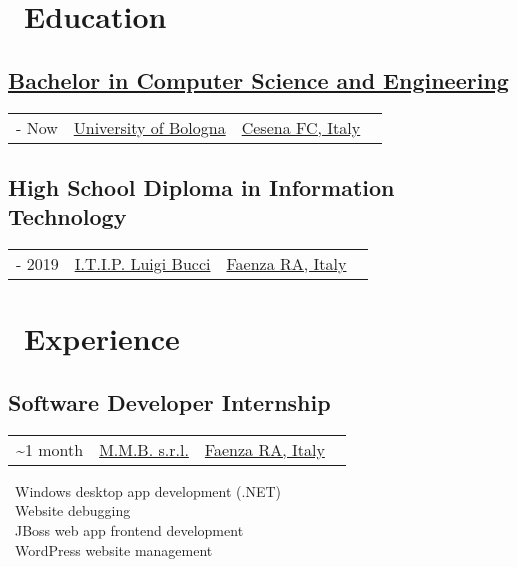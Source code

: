\documentclass{article}
\makeatletter
\newcommand{\event}[3]{
    \begin{tabularx}{\linewidth}{@{}>{\raggedright\arraybackslash}X >{\centering\arraybackslash}X >{\raggedleft\arraybackslash}X@{}}
        #1 & #2 & #3
    \end{tabularx}
    \vspace{-10pt}
}
\makeatother
\begin{document}
\setlength{\columnsep}{50pt}
\begin{paracol}{2}
    \section*{\faGraduationCap \ Education}

    \begin{tcolorbox}
        \subsection*{\href{https://corsi.unibo.it/1cycle/ComputerScienceEngineering}{Bachelor in Computer Science and Engineering}}
        \event
            {\faCalendar* 2019 - Now}
            {\href{https://www.unibo.it/en/}{University of Bologna}}
            {\href{https://www.openstreetmap.org/relation/42809}{Cesena FC, Italy} \ \faCity}
    \end{tcolorbox}

    \begin{tcolorbox}
        \subsection*{High School Diploma in Information Technology}
        \event
            {\faCalendar* 2014 - 2019}
            {\href{https://www.itipfaenza.edu.it/}{I.T.I.P. Luigi Bucci}}
            {\href{https://www.openstreetmap.org/relation/43004}{Faenza RA, Italy} \ \faCity}
    \end{tcolorbox}


    \section*{\faBriefcase \ Experience}

    \begin{tcolorbox}
        \subsection*{Software Developer Internship}
        \event
            {\faCalendar* 2018 \textasciitilde 1 month}
            {\href{https://www.mmbsoftware.it/portalemmb/en/home}{M.M.B. s.r.l.}}
            {\href{https://www.openstreetmap.org/relation/43004}{Faenza RA, Italy} \ \faCity}

        \tcblower
        
        \faDesktop \ Windows desktop app development (.NET) \\
        \faBug \ Website debugging \\
        \faCoffee \ JBoss web app frontend development \\
        \faWordpress \ WordPress website management
    \end{tcolorbox}


\end{paracol}
\end{document}
